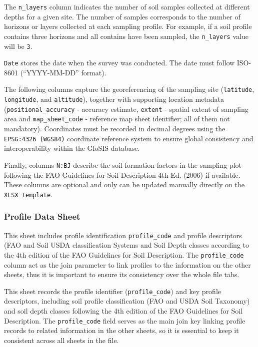 \documentclass[
  10pt,
  b5paper,
  oneside]{book}
\begin{document}
The \texttt{n\_layers} column indicates the number of soil samples collected at different depths for a given site. The number of samples corresponds to the number of horizons or layers collected at each sampling profile. For example, if a soil profile contains three horizons and all contains have been sampled, the \texttt{n\_layers} value will be \texttt{3}.

\texttt{Date} stores the date when the survey was conducted. The date must follow ISO-8601 (``YYYY-MM-DD'' format).

The following columns capture the georeferencing of the sampling site (\texttt{latitude}, \texttt{longitude}, and \texttt{altitude}), together with supporting location metadata (\texttt{positional\_accuracy} - accuracy estimate, \texttt{extent} - spatial extent of sampling area and \texttt{map\_sheet\_code} - reference map sheet identifier; all of them not mandatory). Coordinates must be recorded in decimal degrees using the \texttt{EPSG:4326\ (WGS84)} coordinate reference system to ensure global consistency and interoperability within the GloSIS database.

Finally, columns \texttt{N:BJ} describe the soil formation factors in the sampling plot following the FAO Guidelines for Soil Description 4th Ed. (2006) if available. These columns are optional and only can be updated manually directly on the \texttt{XLSX\ template}.

\subsubsection{Profile Data Sheet}\label{profile-data-sheet}

This sheet includes profile identification \texttt{profile\_code} and profile descriptors (FAO and Soil USDA classification Systems and Soil Depth classes according to the 4th edition of the FAO Guidelines for Soil Description. The \texttt{profile\_code} column act as the join parameter to link profiles to the information on the other sheets, thus it is important to ensure its consistency over the whole file tabs.

This sheet records the profile identifier (\texttt{profile\_code}) and key profile descriptors, including soil profile classification (FAO and USDA Soil Taxonomy) and soil depth classes following the 4th edition of the FAO Guidelines for Soil Description. The \texttt{profile\_code} field serves as the main join key linking profile records to related information in the other sheets, so it is essential to keep it consistent across all sheets in the file.
\end{document}
